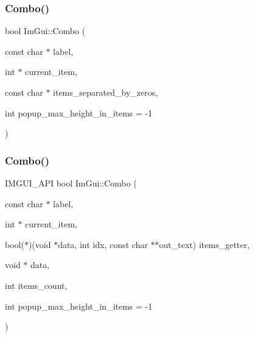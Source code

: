 \hypertarget{namespace_im_gui_ab982779804105fdc57355868ab531cad}{}\label{namespace_im_gui_ab982779804105fdc57355868ab531cad} 
\subsubsection{\texorpdfstring{Combo()}{Combo()}\hspace{0.1cm}{\footnotesize\ttfamily [2/3]}}
{\footnotesize\ttfamily bool Im\+Gui\+::\+Combo (\begin{DoxyParamCaption}\item[{const char $\ast$}]{label,  }\item[{int $\ast$}]{current\+\_\+item,  }\item[{const char $\ast$}]{items\+\_\+separated\+\_\+by\+\_\+zeros,  }\item[{int}]{popup\+\_\+max\+\_\+height\+\_\+in\+\_\+items = {\ttfamily -\/1} }\end{DoxyParamCaption})}

\hypertarget{namespace_im_gui_ae667a68f13233556aa1de9f672dd3f25}{}\label{namespace_im_gui_ae667a68f13233556aa1de9f672dd3f25} 
\subsubsection{\texorpdfstring{Combo()}{Combo()}\hspace{0.1cm}{\footnotesize\ttfamily [3/3]}}
{\footnotesize\ttfamily I\+M\+G\+U\+I\+\_\+\+A\+PI bool Im\+Gui\+::\+Combo (\begin{DoxyParamCaption}\item[{const char $\ast$}]{label,  }\item[{int $\ast$}]{current\+\_\+item,  }\item[{bool($\ast$)(void $\ast$data, int idx, const char $\ast$$\ast$out\+\_\+text)}]{items\+\_\+getter,  }\item[{void $\ast$}]{data,  }\item[{int}]{items\+\_\+count,  }\item[{int}]{popup\+\_\+max\+\_\+height\+\_\+in\+\_\+items = {\ttfamily -\/1} }\end{DoxyParamCaption})}

\hypertarget{namespace_im_gui_a98a4fecf50da4fb3489cee71a72cc577}{}\label{namespace_im_gui_a98a4fecf50da4fb3489cee71a72cc577} 
